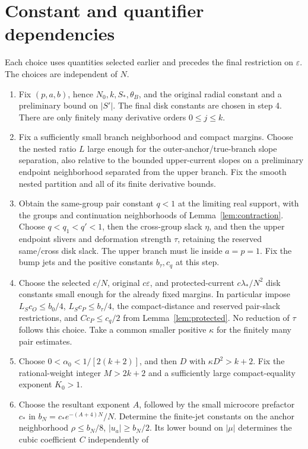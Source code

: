 \documentclass[11pt]{article}
\numberwithin{equation}{section}
\theoremstyle{definition}
\newcommand{\eps}{\varepsilon}
\begin{document}
\section{Constant and quantifier dependencies}\label{app:constants}
Each choice uses quantities selected earlier and precedes the final
restriction on \(\eps\). The choices are independent of \(N\).
\begin{enumerate}
\item Fix \((p,a,b)\), hence \(N_0,k,S_*,\theta_B\), and the
original radial constant and a preliminary bound on \(|S'|\).
The final disk constants are chosen in step 4. There are only finitely many
derivative orders \(0\le j\le k\).
\item Fix a sufficiently small branch neighborhood and compact
margins. Choose the nested ratio \(L\) large enough for the
outer-anchor/true-branch slope separation, also relative to the
bounded upper-current slopes on a preliminary endpoint neighborhood
separated from the upper branch. Fix the smooth nested
partition and all of its finite derivative bounds.
\item Obtain the same-group pair constant \(q<1\) at the limiting
real support, with the groups and continuation neighborhoods of
Lemma~\ref{lem:contraction}. Choose \(q<q_1<q'<1\), then the cross-group slack
\(\eta\), and then the upper endpoint slivers and deformation
strength \(\tau\), retaining the reserved same/cross disk slack.
The upper branch must lie inside \(a=p=1\). Fix the bump jets
and the positive constants \(b_\tau,c_q\) at this step.
\item Choose the selected \(c/N\), original \(c\eps\), and
protected-current \(c\lambda_*/N^2\) disk constants small enough
for the already fixed margins. In particular impose
\(L_Sc_O\le b_0/4\), \(L_Sc_P\le b_\tau/4\), the
compact-distance and reserved pair-slack restrictions, and
\(Cc_P\le c_q/2\) from Lemma~\ref{lem:protected}.
No reduction of \(\tau\) follows this choice. Take a common smaller positive
\(\kappa\) for the finitely many pair estimates.
\item Choose \(0<\alpha_0<1/[2(k+2)]\), and then \(D\) with
\(\kappa D^2>k+2\). Fix the rational-weight integer \(M>2k+2\)
and a sufficiently large compact-equality exponent \(K_0>1\).
\item Choose the resultant exponent \(A\), followed by the small
microcore prefactor \(c_*\) in \(b_N=c_*e^{-(A+4)N}/N\).
Determine the finite-jet constants on the anchor neighborhood
\(\rho\le b_N/8\), \(|u_a|\ge b_N/2\). Its lower bound on
\(|\mu|\) determines the cubic coefficient \(C\) independently of

\end{enumerate}
\end{document}
